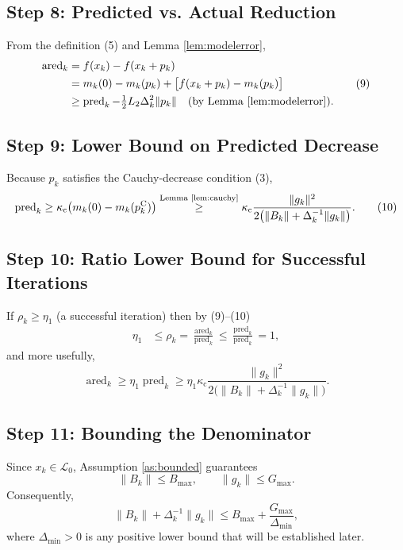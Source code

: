 \documentclass[11pt]{article}
\begin{document}
\subsection*{Step 8: Predicted vs. Actual Reduction}
From the definition (5) and Lemma \ref{lem:modelerror},
\[
\begin{aligned}
\operatorname{ared}_{k}
&=f(x_{k})-f(x_{k}+p_{k})\\
&=m_{k}(0)-m_{k}(p_{k}) +\bigl[f(x_{k}+p_{k})-m_{k}(p_{k})\bigr]\\
&\ge \operatorname{pred}_{k} - \tfrac12 L_{2}\Delta_{k}^{2}\|p_{k}\|
\quad\text{(by Lemma \ref{lem:modelerror})}.
\end{aligned}
\tag{9}
\]

\subsection*{Step 9: Lower Bound on Predicted Decrease}
Because $p_{k}$ satisfies the Cauchy‑decrease condition (3),
\[
\operatorname{pred}_{k}
\ge \kappa_{\mathrm{c}}\bigl(m_{k}(0)-m_{k}(p^{\mathrm{C}}_{k})\bigr)
\stackrel{\text{Lemma \ref{lem:cauchy}}}{\ge}
\kappa_{\mathrm{c}}\frac{\|g_{k}\|^{2}}{2\bigl(\|B_{k}\|+ \Delta_{k}^{-1}\|g_{k}\|\bigr)}.
\tag{10}
\]

\subsection*{Step 10: Ratio Lower Bound for Successful Iterations}
If $\rho_{k}\ge\eta_{1}$ (a successful iteration) then by (9)–(10)
\[
\begin{aligned}
\eta_{1}
&\le\rho_{k}
= \frac{\operatorname{ared}_{k}}{\operatorname{pred}_{k}}
\le \frac{\operatorname{pred}_{k}}{\operatorname{pred}_{k}}
=1,
\end{aligned}
\]
and more usefully,
\[
\operatorname{ared}_{k}
\ge \eta_{1}\operatorname{pred}_{k}
\ge \eta_{1}\kappa_{\mathrm{c}}
\frac{\|g_{k}\|^{2}}{2\bigl(\|B_{k}\|+ \Delta_{k}^{-1}\|g_{k}\|\bigr)}.
\tag{11}
\]

\subsection*{Step 11: Bounding the Denominator}
Since $x_{k}\in\mathcal{L}_{0}$, Assumption \ref{as:bounded} guarantees
\[
\|B_{k}\| \le B_{\max},\qquad \|g_{k}\|\le G_{\max}.
\]
Consequently,
\[
\|B_{k}\|+ \Delta_{k}^{-1}\|g_{k}\|
\le B_{\max}+ \frac{G_{\max}}{\Delta_{\min}},
\tag{12}
\]
where $\Delta_{\min}>0$ is any positive lower bound that will be established later.
\end{document}
